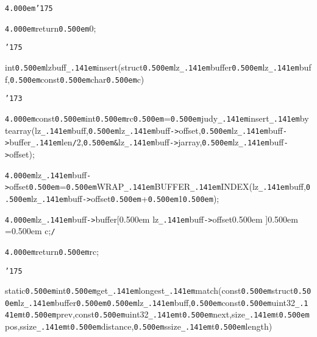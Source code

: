 \noindent
{}{\tt\mc \kern4.000em}{\tt\char'175}

\noindent
{}{\tt\mc \kern4.000em}return{\tt\mc \kern0.500em}0;

\noindent
{}{\tt\char'175}

\noindent
{}\hfill

\noindent
{}int{\tt\mc \kern0.500em}lzbuff{\tt\_\kern.141em}insert(struct{\tt\mc \kern0.500em}lz{\tt\_\kern.141em}buffer{\tt *}{\tt\mc \kern0.500em}lz{\tt\_\kern.141em}buff,{\tt\mc \kern0.500em}const{\tt\mc \kern0.500em}char{\tt\mc \kern0.500em}c)

\noindent
{}{\tt\char'173}

\noindent
{}{\tt\mc \kern4.000em}const{\tt\mc \kern0.500em}int{\tt\mc \kern0.500em}rc{\tt\mc \kern0.500em}={\tt\mc \kern0.500em}judy{\tt\_\kern.141em}insert{\tt\_\kern.141em}bytearray(lz{\tt\_\kern.141em}buff,{\tt\mc \kern0.500em}lz{\tt\_\kern.141em}buff{\tt -}{\tt >}offset,{\tt\mc \kern0.500em}lz{\tt\_\kern.141em}buff{\tt -}{\tt >}buffer{\tt\_\kern.141em}len{\tt /}2,{\tt\mc \kern0.500em}{\tt\&}lz{\tt\_\kern.141em}buff{\tt -}{\tt >}jarray,{\tt\mc \kern0.500em}lz{\tt\_\kern.141em}buff{\tt -}{\tt >}offset);

\noindent
{}{\tt\mc \kern4.000em}lz{\tt\_\kern.141em}buff{\tt -}{\tt >}offset{\tt\mc \kern0.500em}={\tt\mc \kern0.500em}WRAP{\tt\_\kern.141em}BUFFER{\tt\_\kern.141em}INDEX(lz{\tt\_\kern.141em}buff,{\tt\mc \kern0.500em}lz{\tt\_\kern.141em}buff{\tt -}{\tt >}offset{\tt\mc \kern0.500em}+{\tt\mc \kern0.500em}1{\tt\mc \kern0.500em});

\noindent
{}{\tt\mc \kern4.000em}\rm\mc {\tt /}{\tt *}lz{\tt\_\kern.141em}buff{\tt -}{\tt >}buffer[\kern0.500em lz{\tt\_\kern.141em}buff{\tt -}{\tt >}offset\kern0.500em ]\kern0.500em =\kern0.500em c;{\tt *}{\tt /}
\tt\mc 

\noindent
{}{\tt\mc \kern4.000em}return{\tt\mc \kern0.500em}rc;

\noindent
{}{\tt\char'175}

\noindent
{}\hfill

\noindent
{}static{\tt\mc \kern0.500em}int{\tt\mc \kern0.500em}get{\tt\_\kern.141em}longest{\tt\_\kern.141em}match(const{\tt\mc \kern0.500em}struct{\tt\mc \kern0.500em}lz{\tt\_\kern.141em}buffer{\tt\mc \kern0.500em}{\tt *}{\tt\mc \kern0.500em}lz{\tt\_\kern.141em}buff,{\tt\mc \kern0.500em}const{\tt\mc \kern0.500em}uint32{\tt\_\kern.141em}t{\tt\mc \kern0.500em}prev,const{\tt\mc \kern0.500em}uint32{\tt\_\kern.141em}t{\tt\mc \kern0.500em}next,size{\tt\_\kern.141em}t{\tt\mc \kern0.500em}pos,ssize{\tt\_\kern.141em}t{\tt *}{\tt\mc \kern0.500em}distance,{\tt\mc \kern0.500em}ssize{\tt\_\kern.141em}t{\tt *}{\tt\mc \kern0.500em}length)

